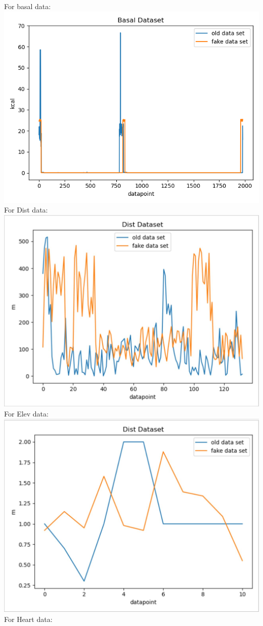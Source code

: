 \documentclass[]{book}
\begin{document}
For basal data:\\
\includegraphics{./phone_app_doc_images/BasalData.png} For Dist data:\\
\includegraphics{./phone_app_doc_images/DistData.JPG} For Elev data:\\
\includegraphics{./phone_app_doc_images/ElevData.JPG} For Heart data:\\
\end{document}
